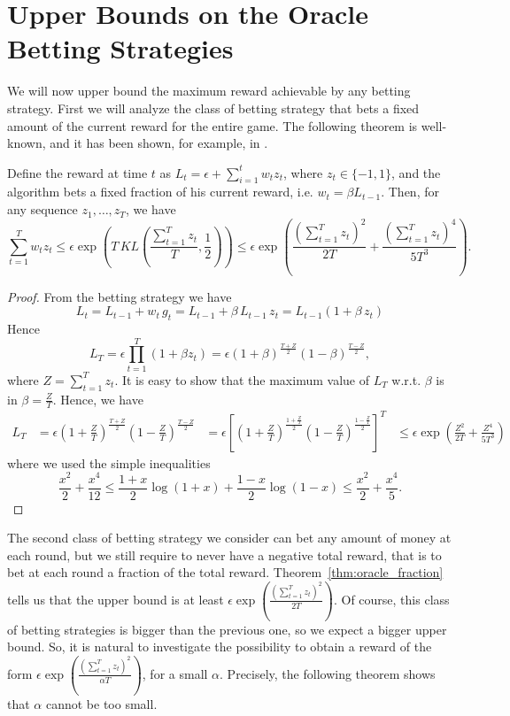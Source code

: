 \section{Upper Bounds on the Oracle Betting Strategies}

We will now upper bound the maximum reward achievable by any betting strategy.
First we will analyze the class of betting strategy that bets a fixed amount of the current reward for the entire game.
The following theorem is well-known, and it has been shown, for example, in \cite{}.

\begin{theorem}
\label{thm:oracle_fraction}
Define the reward at time $t$ as $L_t=\epsilon + \sum_{i=1}^t w_t z_t$, where $z_t\in \{-1,1\}$, and the algorithm bets a fixed fraction of his current reward, i.e. $w_t=\beta L_{t-1}$. Then, for any sequence $z_1, \ldots, z_T$, we have
\[
\sum_{t=1}^T w_t z_t \leq \epsilon \exp\left(T\, KL\left(\frac{\sum_{t=1}^T z_t}{T},\frac{1}{2}\right)\right) \leq \epsilon \exp\left(\frac{(\sum_{t=1}^T z_t)^2}{2T}+\frac{(\sum_{t=1}^T z_t)^4}{5 T^3}\right).
\]
\end{theorem}
\begin{proof}
From the betting strategy we have
\[
L_t=L_{t-1} + w_t \, g_t = L_{t-1} + \beta \, L_{t-1} \, z_t = L_{t-1} (1+\beta \, z_t)
\]
Hence
\[
L_T=\epsilon \prod_{t=1}^T (1+\beta z_t) = \epsilon (1+\beta)^\frac{T+Z}{2} (1-\beta)^\frac{T-Z}{2},
\]
where $Z=\sum_{t=1}^T z_t$.
It is easy to show that the maximum value of $L_T$ w.r.t. $\beta$ is in $\beta=\frac{Z}{T}$. 
Hence, we have
\begin{align}
L_T &= \epsilon (1+\frac{Z}{T})^\frac{T+Z}{2} (1-\frac{Z}{T})^\frac{T-Z}{2} 
&= \epsilon \left[(1+\frac{Z}{T})^\frac{1+\frac{Z}{T}}{2} (1-\frac{Z}{T})^\frac{1-\frac{Z}{T}}{2}\right]^T 
&\leq \epsilon \exp \left(\frac{Z^2}{2 T} + \frac{Z^4}{5 T^3}\right)
\end{align}
where we used the simple inequalities
\[
\frac{x^2}{2} +\frac{x^4}{12}\leq \frac{1+x}{2} \log(1+x) + \frac{1-x}{2}\log(1-x) \leq \frac{x^2}{2} + \frac{x^4}{5}.
\]
\end{proof}

The second class of betting strategy we consider can bet any amount of money at each round, but we still require to never have a negative total reward, that is to bet at each round a fraction of the total reward.  Theorem~\ref{thm:oracle_fraction} tells us that the upper bound is at least $\epsilon \exp\left(\frac{(\sum_{t=1}^T z_t)^2}{2T}\right)$. Of course, this class of betting strategies is bigger than the previous one, so we expect a bigger upper bound. So, it is natural to investigate the possibility to obtain a reward of the form $\epsilon \exp\left(\frac{(\sum_{t=1}^T z_t)^2}{\alpha T}\right)$, for a small $\alpha$. Precisely, the following theorem shows that $\alpha$ cannot be too small.

